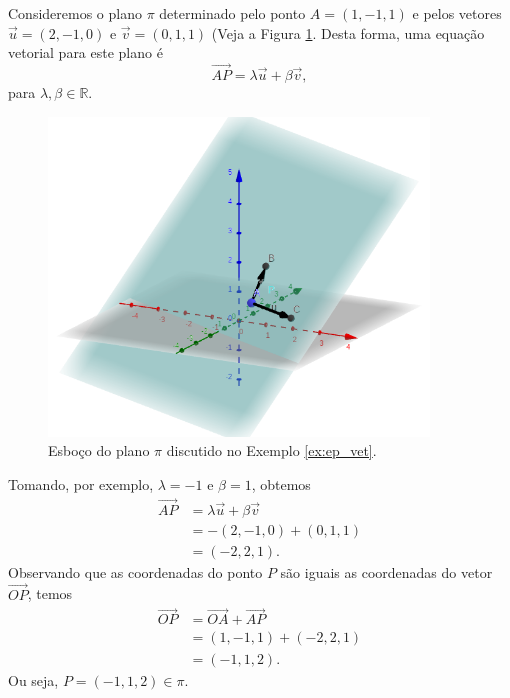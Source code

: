 \begin{ex}\label{ex:ep_vet}
  Consideremos o plano $\pi$ determinado pelo ponto $A = (1,-1,1)$ e pelos vetores $\vec{u} = (2,-1,0)$ e $\vec{v} = (0,1,1)$ (Veja a Figura \ref{fig:ex_ep_vet}. Desta forma, uma equação vetorial para este plano é
  \begin{equation}
    \overrightarrow{AP} = \lambda\vec{u}+\beta\vec{v},
  \end{equation}
  para $\lambda,\beta\in\mathbb{R}$.
  
  \begin{figure}[H]
    \centering
    \includegraphics[width=0.9\textwidth]{./cap_ep/dados/fig_ex_ep_vet/fig_ex_ep_vet}
    \caption{Esboço do plano $\pi$ discutido no Exemplo \ref{ex:ep_vet}.}
    \label{fig:ex_ep_vet}
  \end{figure}
  
  Tomando, por exemplo, $\lambda = -1$ e $\beta = 1$, obtemos
  \begin{align}
    \overrightarrow{AP} &= \lambda\vec{u}+\beta\vec{v}\\
                        &= -(2,-1,0) + (0,1,1)\\
                        &= (-2,2,1).
  \end{align}
  Observando que as coordenadas do ponto $P$ são iguais as coordenadas do vetor $\overrightarrow{OP}$, temos
  \begin{align}
    \overrightarrow{OP} &= \overrightarrow{OA}+\overrightarrow{AP}\\
                        &= (1,-1,1)+(-2,2,1)\\
                        &= (-1,1,2).
  \end{align}
  Ou seja, $P = (-1,1,2)\in\pi$.
\end{ex}

